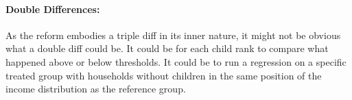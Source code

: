 \begin{subappendices}











\paragraph{Double Differences:} As the reform embodies a triple diff in its inner nature, it might not be obvious what a double diff could be. It could be for each child rank to compare what happened above or below thresholds. It could be to run a regression on a specific treated group with households without children in the same position of the income distribution as the reference group. 



\end{subappendices}
